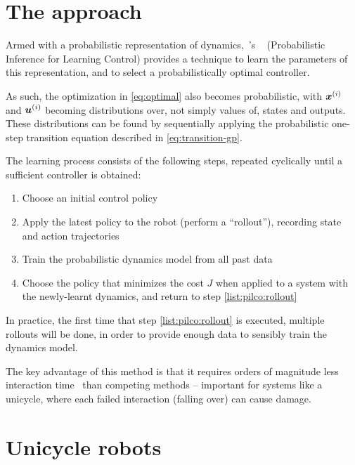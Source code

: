 \documentclass[main.tex]{subfiles}
\begin{document}
\section{The {\Pilco} approach}

	Armed with a probabilistic representation of dynamics,~\citeauthor{pilco}'s {\Pilco}~\cite{pilco} (Probabilistic Inference for Learning Control) provides a technique to learn the parameters of this representation, and to select a probabilistically optimal controller.

	As such, the optimization in \cref{eq:optimal} also becomes probabilistic\footnotemark, with $\bm{x}^{(i)}$ and $\bm{u}^{(i)}$ becoming distributions over, not simply values of, states and outputs. These distributions can be found by sequentially applying the probabilistic one-step transition equation described in \cref{eq:transition-gp}.


	The learning process consists of the following steps, repeated cyclically until a sufficient controller is obtained:
	\begin{enumerate}[nosep]
		\item Choose an initial control policy
		\item Apply the latest policy to the robot (perform a \enquote{rollout}), recording state and action trajectories \label{list:pilco:rollout}
		\item Train the probabilistic dynamics model from all past data
		\item Choose the policy that minimizes the cost $J$ when applied to a system with the newly-learnt dynamics, and return to step \ref{list:pilco:rollout}
	\end{enumerate}
	In practice, the first time that step \ref{list:pilco:rollout} is executed, multiple rollouts will be done, in order to provide enough data to sensibly train the dynamics model.

	The key advantage of this method is that it requires orders of magnitude less interaction time~\cite{pilco} than competing methods -- important for systems like a unicycle, where each failed interaction (falling over) can cause damage.

\section{Unicycle robots}
\end{document}
